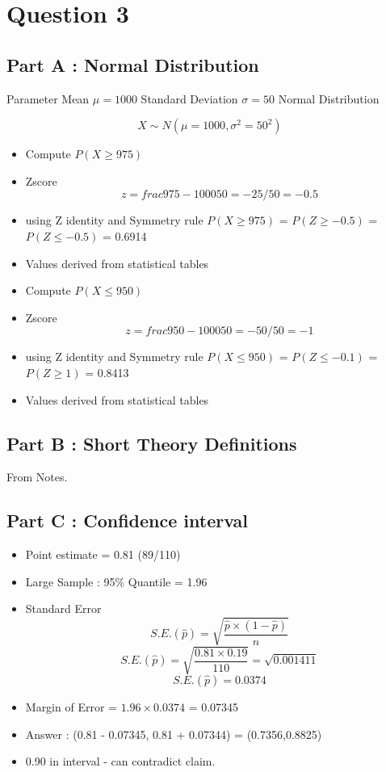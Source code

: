 \documentclass[]{article}
\begin{document}
\newpage
\section*{Question 3}
\subsection*{Part A : Normal Distribution}
Parameter Mean $\mu =1000$ Standard Deviation $\sigma=50$
Normal Distribution

\[ X \sim N(\mu=1000,\sigma^2=50^2)\]

\begin{itemize}
\item Compute $P(X \geq 975)$
\item Zscore
\[ z = frac{975 - 1000}{50} = -25/50 = -0.5\]
\item using Z identity and Symmetry rule
$P(X \geq 975)$ = $P(Z \geq -0.5)$ = $P(Z \leq -0.5)$ =  0.6914
\item Values derived from statistical tables
\end{itemize}

\begin{itemize}
\item Compute $P(X \leq 950)$
\item Zscore
\[ z = frac{950 - 1000}{50} = -50/50 = -1\]
\item using Z identity and Symmetry rule
$P(X \leq 950)$ = $P(Z \leq -0.1)$ = $P(Z \geq 1)$ = 0.8413
\item Values derived from statistical tables
\end{itemize}

\subsection*{Part B : Short Theory Definitions}
From Notes.
\subsection*{Part C : Confidence interval}

\begin{itemize}
\item Point estimate = 0.81 (89/110)
\item Large Sample : 95\% Quantile = 1.96
\item Standard Error 
\[S.E.(\hat{p}) =  \sqrt{  \frac{\hat{p} \times (1-\hat{p})}{n} }\]
\[S.E.(\hat{p}) = \sqrt{\frac{0.81 \times 0.19}{110}} = \sqrt{0.001411}\]
\[S.E.(\hat{p}) = 0.0374\]
\item Margin of Error = $1.96 \times 0.0374$ = 0.07345
\item Answer : (0.81 - 0.07345, 0.81 + 0.07344) =  (0.7356,0.8825)
\item 0.90 in interval - can contradict claim.
\end{itemize}
\end{document}
